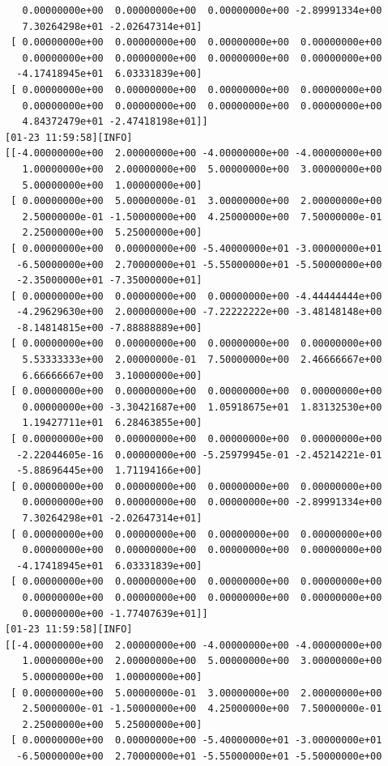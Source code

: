 \documentclass[
  letterpaper,
  DIV=11,
  numbers=noendperiod]{scrartcl}
\begin{document}
\begin{verbatim}
   0.00000000e+00  0.00000000e+00  0.00000000e+00 -2.89991334e+00
   7.30264298e+01 -2.02647314e+01]
 [ 0.00000000e+00  0.00000000e+00  0.00000000e+00  0.00000000e+00
   0.00000000e+00  0.00000000e+00  0.00000000e+00  0.00000000e+00
  -4.17418945e+01  6.03331839e+00]
 [ 0.00000000e+00  0.00000000e+00  0.00000000e+00  0.00000000e+00
   0.00000000e+00  0.00000000e+00  0.00000000e+00  0.00000000e+00
   4.84372479e+01 -2.47418198e+01]]
[01-23 11:59:58][INFO] 
[[-4.00000000e+00  2.00000000e+00 -4.00000000e+00 -4.00000000e+00
   1.00000000e+00  2.00000000e+00  5.00000000e+00  3.00000000e+00
   5.00000000e+00  1.00000000e+00]
 [ 0.00000000e+00  5.00000000e-01  3.00000000e+00  2.00000000e+00
   2.50000000e-01 -1.50000000e+00  4.25000000e+00  7.50000000e-01
   2.25000000e+00  5.25000000e+00]
 [ 0.00000000e+00  0.00000000e+00 -5.40000000e+01 -3.00000000e+01
  -6.50000000e+00  2.70000000e+01 -5.55000000e+01 -5.50000000e+00
  -2.35000000e+01 -7.35000000e+01]
 [ 0.00000000e+00  0.00000000e+00  0.00000000e+00 -4.44444444e+00
  -4.29629630e+00  2.00000000e+00 -7.22222222e+00 -3.48148148e+00
  -8.14814815e+00 -7.88888889e+00]
 [ 0.00000000e+00  0.00000000e+00  0.00000000e+00  0.00000000e+00
   5.53333333e+00  2.00000000e-01  7.50000000e+00  2.46666667e+00
   6.66666667e+00  3.10000000e+00]
 [ 0.00000000e+00  0.00000000e+00  0.00000000e+00  0.00000000e+00
   0.00000000e+00 -3.30421687e+00  1.05918675e+01  1.83132530e+00
   1.19427711e+01  6.28463855e+00]
 [ 0.00000000e+00  0.00000000e+00  0.00000000e+00  0.00000000e+00
  -2.22044605e-16  0.00000000e+00 -5.25979945e-01 -2.45214221e-01
  -5.88696445e+00  1.71194166e+00]
 [ 0.00000000e+00  0.00000000e+00  0.00000000e+00  0.00000000e+00
   0.00000000e+00  0.00000000e+00  0.00000000e+00 -2.89991334e+00
   7.30264298e+01 -2.02647314e+01]
 [ 0.00000000e+00  0.00000000e+00  0.00000000e+00  0.00000000e+00
   0.00000000e+00  0.00000000e+00  0.00000000e+00  0.00000000e+00
  -4.17418945e+01  6.03331839e+00]
 [ 0.00000000e+00  0.00000000e+00  0.00000000e+00  0.00000000e+00
   0.00000000e+00  0.00000000e+00  0.00000000e+00  0.00000000e+00
   0.00000000e+00 -1.77407639e+01]]
[01-23 11:59:58][INFO] 
[[-4.00000000e+00  2.00000000e+00 -4.00000000e+00 -4.00000000e+00
   1.00000000e+00  2.00000000e+00  5.00000000e+00  3.00000000e+00
   5.00000000e+00  1.00000000e+00]
 [ 0.00000000e+00  5.00000000e-01  3.00000000e+00  2.00000000e+00
   2.50000000e-01 -1.50000000e+00  4.25000000e+00  7.50000000e-01
   2.25000000e+00  5.25000000e+00]
 [ 0.00000000e+00  0.00000000e+00 -5.40000000e+01 -3.00000000e+01
  -6.50000000e+00  2.70000000e+01 -5.55000000e+01 -5.50000000e+00

\end{verbatim}
\end{document}
